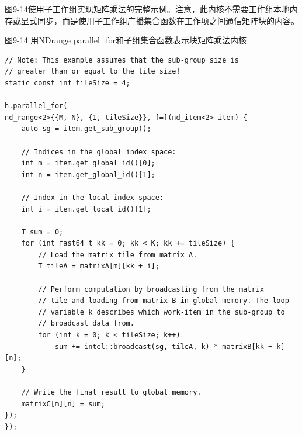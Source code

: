图9-14使用子工作组实现矩阵乘法的完整示例。注意，此内核不需要工作组本地内存或显式同步，而是使用子工作组广播集合函数在工作项之间通信矩阵块的内容。\par

\hspace*{\fill} \par %
图9-14 用NDrange parallel\_for和子组集合函数表示块矩阵乘法内核
\begin{lstlisting}[caption={}]
// Note: This example assumes that the sub-group size is 
// greater than or equal to the tile size!
static const int tileSize = 4;

h.parallel_for(
nd_range<2>{{M, N}, {1, tileSize}}, [=](nd_item<2> item) {
	auto sg = item.get_sub_group();
	
	// Indices in the global index space:
	int m = item.get_global_id()[0];
	int n = item.get_global_id()[1];
	
	// Index in the local index space:
	int i = item.get_local_id()[1];
	
	T sum = 0;
	for (int_fast64_t kk = 0; kk < K; kk += tileSize) {
		// Load the matrix tile from matrix A.
		T tileA = matrixA[m][kk + i];
		
		// Perform computation by broadcasting from the matrix
		// tile and loading from matrix B in global memory. The loop
		// variable k describes which work-item in the sub-group to
		// broadcast data from.
		for (int k = 0; k < tileSize; k++)
			sum += intel::broadcast(sg, tileA, k) * matrixB[kk + k][n];
	}

	// Write the final result to global memory.
	matrixC[m][n] = sum;
});
});
\end{lstlisting}



































